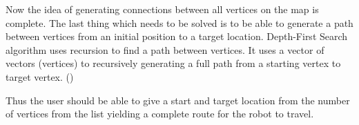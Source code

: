 \documentclass[../Head/Main.tex]{subfiles}
\begin{document}


Now the idea of generating connections between all vertices on the map is complete. The last thing which needs to be solved is to be able to generate a path between vertices from an initial position to a target location. Depth-First Search algorithm uses recursion to find a path between vertices. It uses a vector of vectors (vertices) to recursively generating a full path from a starting vertex to target vertex. (\cite[419-420]{ADA}) 

Thus the user should be able to give a start and target location from the number of vertices from the list yielding a complete route for the robot to travel.
\end{document}
